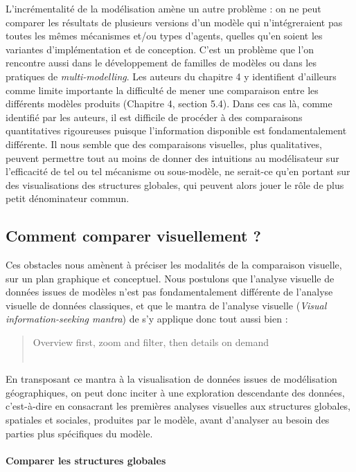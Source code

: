 \documentclass[a4paper, 12pt]{article}
\begin{document}
L'incrémentalité de la modélisation amène un autre problème : on ne peut comparer les résultats de plusieurs versions d'un modèle qui n'intégreraient pas toutes les mêmes mécanismes et/ou types d'agents, quelles qu'en soient les variantes d'implémentation et de conception.
C'est un problème que l'on rencontre aussi dans le développement de \og familles de modèles\fg{} ou dans les pratiques de \textit{multi-modelling}.
Les auteurs du chapitre 4 y identifient d'ailleurs comme limite importante la difficulté de mener une comparaison entre les différents modèles produits (Chapitre 4, section 5.4).
Dans ces cas là, comme identifié par les auteurs, il est difficile de procéder à des comparaisons quantitatives rigoureuses puisque l'information disponible est fondamentalement différente.
Il nous semble que des comparaisons visuelles, plus qualitatives, peuvent permettre tout au moins de donner des intuitions au modélisateur sur l'efficacité de tel ou tel mécanisme ou sous-modèle, ne serait-ce qu'en portant sur des visualisations des structures globales, qui peuvent alors jouer le rôle de \og plus petit dénominateur commun\fg{}.

\subsection{Comment comparer visuellement ?}

Ces obstacles nous amènent à préciser les modalités de la comparaison visuelle, sur un plan graphique et conceptuel.
Nous postulons que l'analyse visuelle de données issues de modèles n'est pas fondamentalement différente de l'analyse visuelle de données classiques, et que le \og mantra\fg{} de l'analyse visuelle (\og \textit{Visual information-seeking mantra}\fg{}) de  s'y applique donc tout aussi bien :
\begin{quote}
	\centering
\og Overview first, zoom and filter, then details on demand\fg{}\\
\mbox{}~ \hfill \cite[\ppno~2]{shneiderman1996eyes}
\end{quote}

En transposant ce mantra à la visualisation de données issues de modélisation géographiques, on peut donc inciter à une exploration descendante des données, c'est-à-dire en consacrant les premières analyses visuelles aux structures globales, spatiales et sociales, produites par le modèle, avant d'analyser au besoin des parties plus spécifiques du modèle.

\paragraph{Comparer les structures globales}
\end{document}
